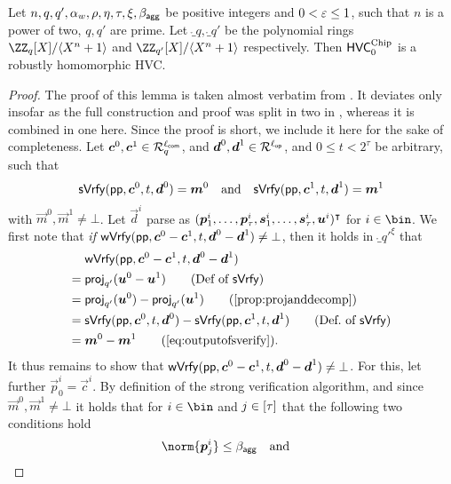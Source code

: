 \begin{lemma}\label{lem:hvcrobhom}
  Let $n,q,q',\alpha_w,\rho,\eta,\tau,\xi,\beta_{\mathsf{agg}}$ be positive integers and $0<\varepsilon\leq 1$, such that $n$ is a power of two, $q,q'$ are prime.
  Let $\ring_q,\ring_{q'}$ be the polynomial rings $\defringq$ and $\defringqq$ respectively.
  Then $\mathsf{HVC}^{\textup{Chip}}_{0}$ is a robustly homomorphic HVC.
\end{lemma}
\begin{proof}
The proof of this lemma is taken almost verbatim from \cite{CCS:FleSimZha22}.
It deviates only insofar as the full construction and proof was split in two in \cite{CCS:FleSimZha22}, whereas it is combined in one here.
Since the proof is short, we include it here for the sake of completeness. %
Let $\boldsymbol{c}^0,\boldsymbol{c}^1 \in \mathcal{R}_q^{\ell_{\mathsf{com}}}$, and $\boldsymbol{d}^0, \boldsymbol{d}^1 \in \mathcal{R}^{\ell_{\mathsf{op}}}$, and $0\leq t <2^\tau$ be arbitrary, such that
\begin{equation}
    \mathsf{sVrfy}(\mathsf{pp},\boldsymbol{c}^0, t,\boldsymbol{d}^0)=\boldsymbol{m}^0 \quad \text{and} \quad \mathsf{sVrfy}(\mathsf{pp},\boldsymbol{c}^1, t,\boldsymbol{d}^1)=\boldsymbol{m}^1\label{eq:outputofsverify}
\end{equation}
with $\vec{m}^0,\vec{m}^1\neq \bot$.
Let $\vec{d}^i$ parse as $(\boldsymbol{p}^i_1,\dots,\boldsymbol{p}^i_{\tau},\boldsymbol{s}^i_1, \dots, \boldsymbol{s}^i_{\tau},\boldsymbol{u}^i)^\intercal$ for $i\in\bin$.
We first note that \emph{if} $\mathsf{wVrfy}(\mathsf{pp},\boldsymbol{c}^0-\boldsymbol{c}^1, t,\boldsymbol{d}^0-\boldsymbol{d}^1)\neq\bot$, then it holds in $\ring_{q'}^\xi$ that
\begin{align*}
  &\wverify(\params,\vec{c}^0-\vec{c}^1, t,\vec{d}^0-\vec{d}^1)\\
  ={}&\projmod{q'}(\vec{u}^0-\vec{u}^1)\tag{Def of $\sverify$}\\
  ={}&\projmod{q'}(\vec{u}^0)-\projmod{q'}(\vec{u}^1)\tag{\autoref{prop:projanddecomp}}\\
  ={}&\sverify(\params,\vec{c}^0, t,\vec{d}^0)-\sverify(\params,\vec{c}^1, t,\vec{d}^1)\tag{Def.\ of $\sverify$}\\
  ={}&\vec{m}^0- \vec{m}^1 \tag{\autoref{eq:outputofsverify}}.
\end{align*}
%
It thus remains to show that $\mathsf{wVrfy}(\mathsf{pp},\boldsymbol{c}^0-\boldsymbol{c}^1, t,\boldsymbol{d}^0-\boldsymbol{d}^1)\neq\bot$.
For this, let further $\vec{p}^i_0 = \vec{c}^i$.
By definition of the strong verification algorithm, and since $\vec{m}^0,\vec{m}^1\neq\bot$ it holds that for $i\in\bin$ 
and $j \in [\tau]$ that the following two conditions hold
\begin{align}
  \norm{\vec{p}^i_{j}} \leq \bagg\quad\text{and}\quad

\end{align}
\end{proof}
